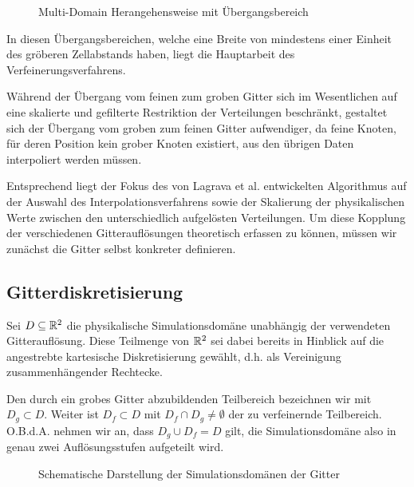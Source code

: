 \begin{figure}[h]
\centering

\caption{Multi-Domain Herangehensweise mit Übergangsbereich \cite[vgl.~Abb.~3]{lagrava12}}
\label{fig:MultiDomainOverlap}
\end{figure}

\noindent
In diesen Übergangsbereichen, welche eine Breite von mindestens einer Einheit des gröberen Zellabstands haben, liegt die Hauptarbeit des Verfeinerungsverfahrens.

\bigskip
Während der Übergang vom feinen zum groben Gitter sich im Wesentlichen auf eine skalierte und gefilterte Restriktion der Verteilungen beschränkt, gestaltet sich der Übergang vom groben zum feinen Gitter aufwendiger, da feine Knoten, für deren Position kein grober Knoten existiert, aus den übrigen Daten interpoliert werden müssen.

Entsprechend liegt der Fokus des von Lagrava et al. entwickelten Algorithmus auf der Auswahl des Interpolationsverfahrens sowie der Skalierung der physikalischen Werte zwischen den unterschiedlich aufgelösten Verteilungen. Um diese Kopplung der verschiedenen Gitterauflösungen theoretisch erfassen zu können, müssen wir zunächst die Gitter selbst konkreter definieren.

\newpage
\subsection{Gitterdiskretisierung}

\begin{Definition}
\label{def:SimDomain}
Sei \(D \subseteq \mathbb{R}^2\) die physikalische Simulationsdomäne unabhängig der verwendeten Gitterauflösung. Diese Teilmenge von \(\mathbb{R}^2\) sei dabei bereits in Hinblick auf die angestrebte kartesische Diskretisierung gewählt, d.h. als Vereinigung zusammenhängender Rechtecke.

Den durch ein grobes Gitter abzubildenden Teilbereich bezeichnen wir mit \(D_g \subset D\). Weiter ist \(D_f \subset D\) mit \(D_f \cap D_g \neq \emptyset\) der zu verfeinernde Teilbereich. O.B.d.A. nehmen wir an, dass \(D_g \cup D_f = D\) gilt, die Simulationsdomäne also in genau zwei Auflösungsstufen aufgeteilt wird.
\end{Definition}

\begin{figure}[h]
\centering

\caption{Schematische Darstellung der Simulationsdomänen der Gitter}
\label{fig:SimDomain}
\end{figure}

